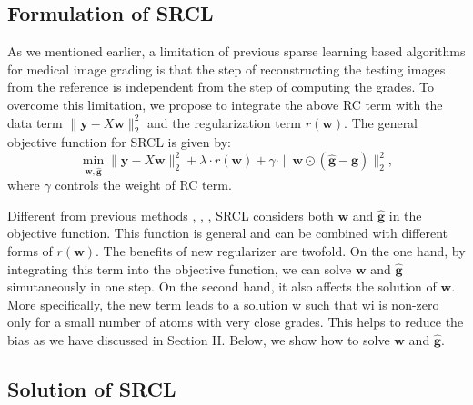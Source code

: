 \documentclass[journal]{IEEEtran}
\begin{document}
 \subsection{Formulation of SRCL}
 As we mentioned earlier, a limitation of previous sparse learning based algorithms for medical image grading is that the step of   reconstructing the testing images from the reference is independent from the step of computing the grades.  To overcome this limitation,  we propose to integrate  the above RC  term with the data term
 $\|\textbf{y}-X\textbf{w}\|^2_2$  and the regularization term $r(\textbf{w})$. The  general objective function for SRCL is given by:
  \begin{equation}
  \min_{\textbf{w},\hat{\textbf{g}}} \|\textbf{y}-X\textbf{w}\|^2_2+ \lambda \cdot r(\textbf{w}) +\gamma  \cdot \|\textbf{w}\odot (\hat{\textbf{g}} -\textbf{g})  \|_2^2, \label{srlobj}
  \end{equation}
  where $\gamma$ controls the weight
  of RC term.

  Different from previous methods \cite{sparsecoding}, \cite{CJ15}, \cite{sparseGroupLasso}, SRCL considers both $\textbf{w}$ and $\hat{\textbf{g}}$ in the objective function.  This function is general and can be combined with different forms of  $r(\textbf{w})$. The benefits of new regularizer are twofold. On the one hand,
  by integrating this term into the objective function, we can
  solve $\textbf{w}$ and ${\hat{\textbf{g}}}$ simutaneously in one step. On the second hand,
  it also affects the solution of $\textbf{w}$. More specifically, the new
  term leads to a solution w such that wi is non-zero only for
  a small number of atoms with very close grades. This helps
  to reduce the bias as we have discussed in Section II.
  Below, we show how to solve $\textbf{w}$ and $\hat{{\textbf{g}}}$.

   \subsection{Solution of SRCL} \label{solution}
\end{document}

